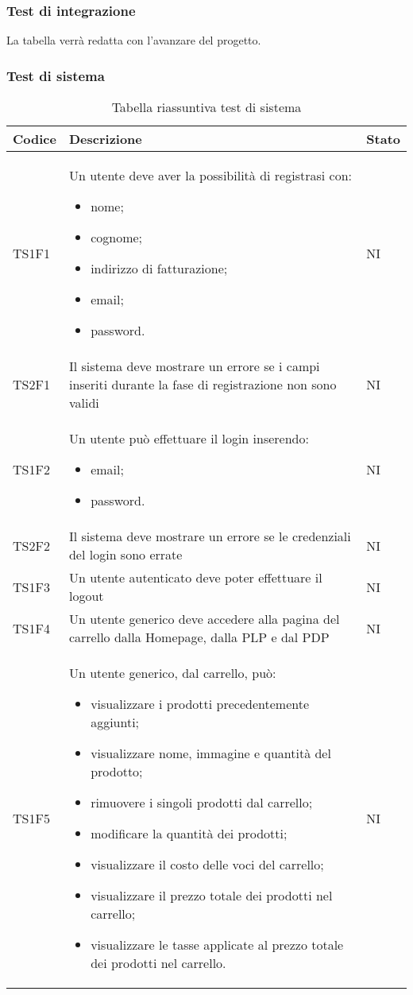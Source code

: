\subsubsection{Test di integrazione}
La tabella verrà redatta con l'avanzare del progetto.

\subsubsection{Test di sistema}
{

\centering
\renewcommand{\arraystretch}{2}
\begin{longtable}{C{3cm} C{10.2cm} C{1.5cm}}
\caption{Tabella riassuntiva test di sistema}\\
\textbf{Codice} &
\textbf{Descrizione}&
\textbf{Stato}\\
\endhead


TS1F1 & Un utente deve aver la possibilità di registrasi con:
\begin{itemize}
	\item nome;
	\item cognome;
	\item indirizzo di fatturazione;
	\item email;
	\item password.
\end{itemize} & NI\\
TS2F1 & Il sistema deve mostrare un errore se
i campi inseriti durante la fase di registrazione non sono validi & NI\\
TS1F2 & Un utente può effettuare il login inserendo:
\begin{itemize}
	\item email;
	\item password.
\end{itemize} &  NI\\
TS2F2 & Il sistema deve mostrare un errore se le credenziali del login sono errate & NI\\
TS1F3 & Un utente autenticato deve poter effettuare il
logout & NI\\
TS1F4 & Un utente generico deve accedere alla pagina del carrello dalla Homepage, dalla PLP e dal PDP & NI\\
TS1F5 & Un utente generico, dal carrello, può:
\begin{itemize}
	\item visualizzare i prodotti precedentemente aggiunti;
	\item visualizzare nome, immagine e quantità del prodotto;
	\item rimuovere i singoli prodotti dal carrello;
	\item modificare la quantità dei prodotti;
	\item visualizzare il costo delle voci del carrello;
	\item visualizzare il prezzo totale dei prodotti nel carrello;
	\item visualizzare le tasse applicate al prezzo totale dei prodotti nel carrello.
\end{itemize}
& NI\\


\end{longtable}}
